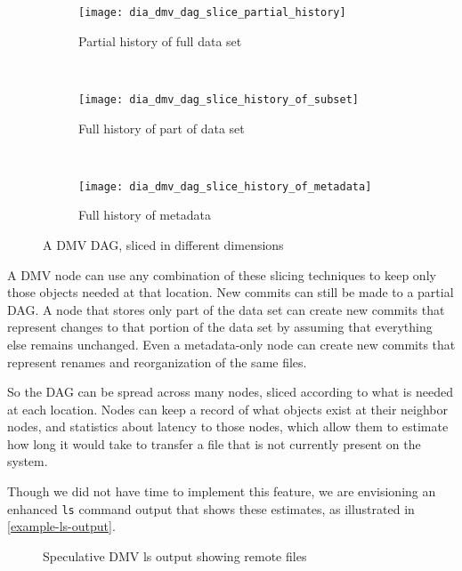 \newcommand{\slicediagramwidth}{0.45\textwidth}

\begin{figure}

    \centering

    \begin{subfigure}[]{\slicediagramwidth}
        \texttt{[image: dia\_dmv\_dag\_slice\_partial\_history]}
        \caption{Partial history of full data set}
        \label{dia_dmv_dag_slice_partial_history}
    \end{subfigure}
    ~
    \begin{subfigure}[]{\slicediagramwidth}
        \texttt{[image: dia\_dmv\_dag\_slice\_history\_of\_subset]}
        \caption{Full history of part of data set}
        \label{dia_dmv_dag_slice_history_of_subset}
    \end{subfigure}
    ~
    \begin{subfigure}[]{\slicediagramwidth}
        \texttt{[image: dia\_dmv\_dag\_slice\_history\_of\_metadata]}
        \caption{Full history of metadata}
        \label{dia_dmv_dag_slice_history_of_metadata}
    \end{subfigure}

    \caption{A DMV DAG, sliced in different dimensions}
\end{figure}

A DMV node can use any combination of these slicing techniques to keep only
those objects needed at that location. New commits can still be made to a
partial DAG. A node that stores only part of the data set can create new commits
that represent changes to that portion of the data set by assuming that
everything else remains unchanged. Even a metadata-only node can create new
commits that represent renames and reorganization of the same files.

So the DAG can be spread across many nodes, sliced according to what is needed
at each location. Nodes can keep a record of what objects exist at their
neighbor nodes, and statistics about latency to those nodes, which allow them to
estimate how long it would take to transfer a file that is not currently present
on the system.

Though we did not have time to implement this feature, we are envisioning an
enhanced \lstinline{ls} command output that shows these estimates, as
illustrated in \autoref{example-ls-output}.

\begin{figure}[]
    \caption{Speculative DMV ls output showing remote files}
    \label{example-ls-output}
    
\end{figure}


%
